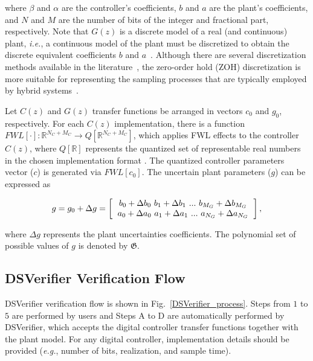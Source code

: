 \documentclass{sig-alternate-05-2015}
\begin{document}
\noindent where $\beta$ and $\alpha$ are the controller's coefficients, $b$ and $a$ are the plant's coefficients, and $N$ and $M$ are the number of bits of the integer and fractional part, respectively. Note that $G(z)$ is a discrete model of a real (and continuous) plant, {\it i.e.}, a continuous model of the plant must be discretized to obtain the discrete equivalent coefficients $b$ and $a$~\cite{Astrom08}. Although there are several discretization methods available in the literature~\cite{Franklin15}, the zero-order hold (ZOH) discretization is more suitable for representing the sampling processes that are typically employed by hybrid systems~\cite{istepanian2012digital}.

Let $C(z)$ and $G(z)$ transfer functions be arranged in vectors $c_0$ and $g_0$, respectively.
For each $C(z)$ implementation, there is a function $FWL[\cdot]:\mathbb{R}^{N_C+M_C}\rightarrow Q[\mathbb{R}^{N_C+M_C}]$, which applies FWL effects to the controller $C(z)$, where $Q[\mathbb{R}]$ represents the quantized set of representable real numbers in the chosen implementation format . The quantized controller parameters vector ($c$) is generated via $FWL[c_0]$. The uncertain plant parameters ($g$) can be expressed as

\begin{equation}
g = g_0 + \Delta{g} = \left [
				\begin{tabular}{c}
				$b_{0}+\Delta{b_{0}} ~ b_{1}+\Delta{b_{1}} ~ ... ~ b_{M_G}+\Delta{b_{M_G}}$ \\%
				$a_{0}+\Delta{a_{0}} ~ a_{1}+\Delta{a_{1}} ~ ... ~ a_{N_G}+\Delta{a_{N_G}}$
				\end{tabular}
				\right ],
\end{equation}
 
\vspace{1 mm} 
\noindent where $\Delta{g}$ represents the plant uncertainties coefficients. The polynomial set of possible values of $g$ is denoted by $\mathfrak{G}$.

\subsection{DSVerifier Verification Flow}
\label{verification-flow}

DSVerifier verification flow is shown in Fig.~\ref{DSVerifier_process}. Steps from $1$ to $5$ are performed by users and Steps A to D are automatically performed by DSVerifier, which accepts the digital controller transfer functions together with the plant model. For any digital controller, implementation details should be provided ({\it e.g.}, number of bits, realization, and sample time).
\end{document}
